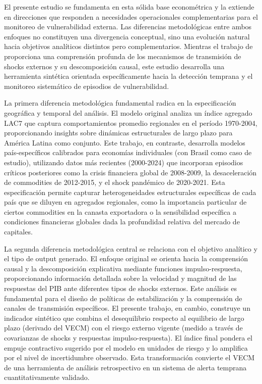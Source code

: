 \documentclass[3p,11pt,draft,natbib=false]{elsarticle}
\begin{document}
El presente estudio se fundamenta en esta sólida base econométrica y la extiende en direcciones que responden a necesidades operacionales complementarias para el monitoreo de vulnerabilidad externa. Las diferencias metodológicas entre ambos enfoques no constituyen una divergencia conceptual, sino una evolución natural hacia objetivos analíticos distintos pero complementarios. Mientras el trabajo de \citet{izquierdo2008booms} proporciona una comprensión profunda de los mecanismos de transmisión de shocks externos y su descomposición causal, este estudio desarrolla una herramienta sintética orientada específicamente hacia la detección temprana y el monitoreo sistemático de episodios de vulnerabilidad.

La primera diferencia metodológica fundamental radica en la especificación geográfica y temporal del análisis. El modelo original analiza un índice agregado LAC7 que captura comportamientos promedio regionales en el período 1970-2004, proporcionando insights sobre dinámicas estructurales de largo plazo para América Latina como conjunto. Este trabajo, en contraste, desarrolla modelos país-específicos calibrados para economías individuales (con Brasil como caso de estudio), utilizando datos más recientes (2000-2024) que incorporan episodios críticos posteriores como la crisis financiera global de 2008-2009, la desaceleración de commodities de 2012-2015, y el shock pandémico de 2020-2021. Esta especificación permite capturar heterogeneidades estructurales específicas de cada país que se diluyen en agregados regionales, como la importancia particular de ciertos commodities en la canasta exportadora o la sensibilidad específica a condiciones financieras globales dada la profundidad relativa del mercado de capitales.

La segunda diferencia metodológica central se relaciona con el objetivo analítico y el tipo de output generado. El enfoque original se orienta hacia la comprensión causal y la descomposición explicativa mediante funciones impulso-respuesta, proporcionando información detallada sobre la velocidad y magnitud de las respuestas del PIB ante diferentes tipos de shocks externos. Este análisis es fundamental para el diseño de políticas de estabilización y la comprensión de canales de transmisión específicos. El presente trabajo, en cambio, construye un indicador sintético que combina el desequilibrio respecto al equilibrio de largo plazo (derivado del VECM) con el riesgo externo vigente (medido a través de covarianzas de shocks y respuestas impulso-respuesta). El índice final pondera el empuje contractivo sugerido por el modelo en unidades de riesgo y lo amplifica por el nivel de incertidumbre observado. Esta transformación convierte el VECM de una herramienta de análisis retrospectivo en un sistema de alerta temprana cuantitativamente validado.
\end{document}
